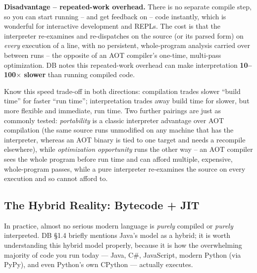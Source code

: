 \documentclass[full-course-notes.tex]{subfiles}
\begin{document}
\textbf{Disadvantage -- repeated-work overhead.} There is no separate compile step, so you can
start running -- and get feedback on -- code instantly, which is wonderful for interactive
development and REPLs. The cost is that the interpreter re-examines and re-dispatches on the
source (or its parsed form) on \emph{every} execution of a line, with no persistent, whole-program
analysis carried over between runs -- the opposite of an AOT compiler's one-time, multi-pass
optimization. DB notes this repeated-work overhead can make interpretation \textbf{10--100$\times$
slower} than running compiled code.

\begin{examfocus}
Know this speed trade-off in both directions: compilation trades slower ``build time'' for
faster ``run time''; interpretation trades away build time for slower, but more flexible and
immediate, run time. Two further pairings are just as commonly tested: \emph{portability} is a
classic interpreter advantage over AOT compilation (the same source runs unmodified on any
machine that has the interpreter, whereas an AOT binary is tied to one target and needs a
recompile elsewhere), while \emph{optimization opportunity} runs the other way -- an AOT compiler
sees the whole program before run time and can afford multiple, expensive, whole-program passes,
while a pure interpreter re-examines the source on every execution and so cannot afford to.
\end{examfocus}

\subsection{The Hybrid Reality: Bytecode + JIT}
\label{sec:l1-hybrid-jit}

\beyonddb In practice, almost no serious modern language is \emph{purely} compiled or
\emph{purely} interpreted. DB \S1.4 briefly mentions Java's model as a hybrid; it is worth
understanding this hybrid model properly, because it is how the overwhelming majority of code
you run today --- Java, C\#, JavaScript, modern Python (via PyPy), and even Python's own CPython
--- actually executes.
\end{document}
